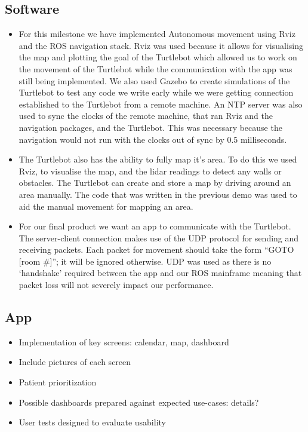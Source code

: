 \documentclass{article}
\begin{document}
\subsection{Software}
\begin{itemize}
\item For this milestone we have implemented Autonomous movement using Rviz and the ROS navigation stack. Rviz was used because it allows for visualising the map and plotting the goal of the Turtlebot which allowed us to work on the movement of the Turtlebot while the communication with the app was still being implemented. We also used Gazebo to create simulations of the Turtlebot to test any code we write early while we were getting connection established to the Turtlebot from a remote machine. An NTP server was also used to sync the clocks of the remote machine, that ran Rviz and the navigation packages, and the Turtlebot. This was necessary because the navigation would not run with the clocks out of sync by 0.5 milliseconds.
\item The Turtlebot also has the ability to fully map it's area. To do this we used Rviz, to visualise the map, and the lidar readings to detect any walls or obstacles. The Turtlebot can create and store a map by driving around an area manually. The code that was written in the previous demo was used to aid the manual movement for mapping an area.
\item For our final product we want an app to communicate with the Turtlebot.
The server-client connection makes use of the UDP protocol for sending and receiving packets. Each packet for movement should take the form ``GOTO [room \#]''; it will be ignored otherwise. UDP was used as there is no `handshake' required between the app and our ROS mainframe meaning that packet loss will not severely impact our performance.
\end{itemize}

\subsection{App}
\begin{itemize}
\item Implementation of key screens: calendar, map, dashboard
\item Include pictures of each screen
\item Patient prioritization
\item Possible dashboards prepared against expected use-cases: details?
\item User tests designed to evaluate usability
\end{itemize}
\end{document}
